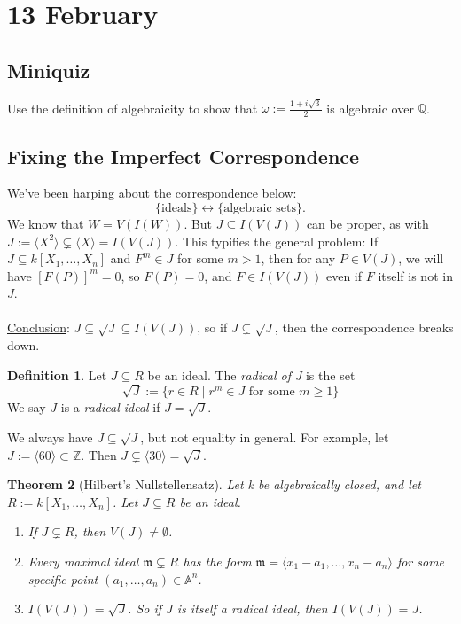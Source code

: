 \documentclass[12pt]{article}
\newcommand{\z}{\mathbb{Z}}
\newcommand{\q}{\mathbb{Q}}
\newcommand{\ita}[1]{\textit{#1}}
\newcommand{\vbrack}[1]{\langle #1\rangle}
\newtheorem{theorem}{Theorem}[section]
\theoremstyle{definition}
\newtheorem{definition}[theorem]{Definition}
\begin{document}
\section{13 February}
\subsection{Miniquiz}
Use the definition of algebraicity to show that $\omega:=\frac{1+i\sqrt{3}}{2}$ is algebraic over $\q$.
\subsection{Fixing the Imperfect Correspondence}
We've been harping about the correspondence below:
\[\{\text{ideals}\}\stackrel{}{\longleftrightarrow}\{\text{algebraic sets}\}.\]
We know that $W=V(I(W))$. But $J\subseteq I(V(J))$ can be proper, as with $J:=\vbrack{X^2}\subsetneq\vbrack{X}=I(V(J))$. This typifies the general problem: If $J\subseteq k[X_1,\dotsc,X_n]$ and $F^m\in J$ for some $m>1$, then for any $P\in V(J)$, we will have $[F(P)]^m=0$, so $F(P)=0$, and $F\in I(V(J))$ even if $F$ itself is not in $J$.\\\\
\underline{Conclusion}: $J\subseteq\sqrt{J}\subseteq I(V(J))$, so if $J\subsetneq\sqrt{J}$, then the correspondence breaks down.
\begin{definition}
    Let $J\subseteq R$ be an ideal. The \ita{radical of J} is the set
    \begin{equation}
        \sqrt{J}:=\{r\in R\mid r^m\in J\text{ for some }m\geq1\}
    \end{equation}
    We say $J$ is a \ita{radical ideal} if $J=\sqrt{J}$.
\end{definition}
We always have $J\subseteq\sqrt{J}$, but not equality in general. For example, let $J:=\vbrack{60}\subset\z$. Then $J\subsetneq\vbrack{30}=\sqrt{J}$.
\begin{theorem}[Hilbert's Nullstellensatz]
    Let k be algebraically closed, and let $R:=k[X_1,\dotsc,X_n]$. Let $J\subseteq R$ be an ideal.
    \begin{enumerate}
        \item If $J\subsetneq R$, then $V(J)\neq\emptyset$.
        \item Every maximal ideal $\mathfrak{m}\subsetneq R$ has the form $\mathfrak{m}=\vbrack{x_1-a_1,\dotsc,x_n-a_n}$ for some specific point $(a_1,\dotsc,a_n)\in\mathbb{A}^n$.
        \item $I(V(J))=\sqrt{J}$. So if $J$ is itself a radical ideal, then $I(V(J))=J$. 
    \end{enumerate}
\end{theorem}
\end{document}
